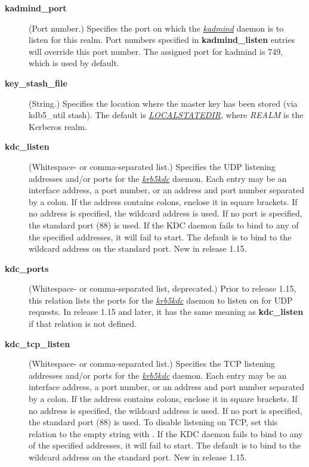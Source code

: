 \documentclass[letterpaper,10pt,english]{sphinxmanual}
\begin{document}
\begin{description}
\item[{\textbf{kadmind\_port}}] \leavevmode
(Port number.)  Specifies the port on which the {\hyperref[admin/admin_commands/kadmind:kadmind-8]{\emph{kadmind}}}
daemon is to listen for this realm.  Port numbers specified in
\textbf{kadmind\_listen} entries will override this port number.  The
assigned port for kadmind is 749, which is used by default.

\item[{\textbf{key\_stash\_file}}] \leavevmode
(String.)  Specifies the location where the master key has been
stored (via kdb5\_util stash).  The default is {\hyperref[mitK5defaults:paths]{\emph{LOCALSTATEDIR}}}, where \emph{REALM} is the Kerberos realm.

\item[{\textbf{kdc\_listen}}] \leavevmode
(Whitespace- or comma-separated list.)  Specifies the UDP
listening addresses and/or ports for the {\hyperref[admin/admin_commands/krb5kdc:krb5kdc-8]{\emph{krb5kdc}}} daemon.
Each entry may be an interface address, a port number, or an
address and port number separated by a colon.  If the address
contains colons, enclose it in square brackets.  If no address is
specified, the wildcard address is used.  If no port is specified,
the standard port (88) is used.  If the KDC daemon fails to bind
to any of the specified addresses, it will fail to start.  The
default is to bind to the wildcard address on the standard port.
New in release 1.15.

\item[{\textbf{kdc\_ports}}] \leavevmode
(Whitespace- or comma-separated list, deprecated.)  Prior to
release 1.15, this relation lists the ports for the
{\hyperref[admin/admin_commands/krb5kdc:krb5kdc-8]{\emph{krb5kdc}}} daemon to listen on for UDP requests.  In
release 1.15 and later, it has the same meaning as \textbf{kdc\_listen}
if that relation is not defined.

\item[{\textbf{kdc\_tcp\_listen}}] \leavevmode
(Whitespace- or comma-separated list.)  Specifies the TCP
listening addresses and/or ports for the {\hyperref[admin/admin_commands/krb5kdc:krb5kdc-8]{\emph{krb5kdc}}} daemon.
Each entry may be an interface address, a port number, or an
address and port number separated by a colon.  If the address
contains colons, enclose it in square brackets.  If no address is
specified, the wildcard address is used.  If no port is specified,
the standard port (88) is used.  To disable listening on TCP, set
this relation to the empty string with .
If the KDC daemon fails to bind to any of the specified addresses,
it will fail to start.  The default is to bind to the wildcard
address on the standard port.  New in release 1.15.


\end{description}
\end{document}
